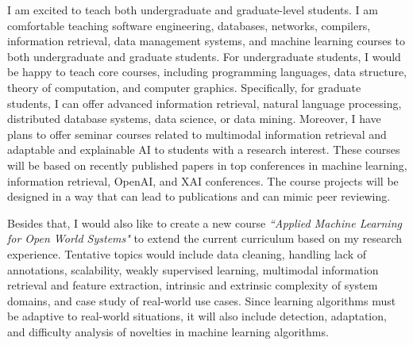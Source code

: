 I am excited to teach both undergraduate and graduate-level students. I am comfortable teaching software engineering, databases, networks, compilers, information retrieval, data management systems, and machine learning courses to both undergraduate and graduate students. 
For undergraduate students, I would be happy to teach core courses, including %
programming languages, data structure, theory of computation, and computer graphics. Specifically, for graduate students, I can offer advanced information retrieval, natural language processing, distributed database systems, data science, or data mining.
%
Moreover, I have plans to offer seminar courses related to multimodal information retrieval and adaptable and explainable AI to students with a research interest. 
These courses will be based on recently published papers in top conferences in machine learning, information retrieval, OpenAI, and XAI conferences. The course projects will be designed in a way that can lead to publications and can mimic peer reviewing. 
%

Besides that, I would also like to create a new course \textit{``Applied Machine Learning for Open World Systems"} to extend the current curriculum based on my research experience. Tentative topics would include data cleaning, 
handling lack of annotations, scalability,
weakly supervised learning, multimodal information retrieval and feature extraction, intrinsic and extrinsic complexity of system domains, and case study of real-world use cases. Since learning algorithms must be adaptive to real-world situations, it will also include detection, adaptation, and difficulty analysis of novelties in machine learning algorithms.